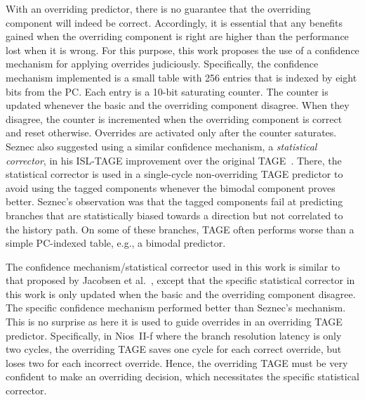 With an overriding predictor, there is no guarantee that the overriding component will indeed be correct. Accordingly, it is essential that any benefits gained when the overriding component is right are higher than the performance lost when it is wrong. For this purpose, this work proposes the use of a confidence mechanism for applying overrides judiciously. Specifically, the confidence mechanism implemented is a small table with 256 entries that is indexed by eight bits from the PC. Each entry is a 10-bit saturating counter.  The counter is updated whenever the basic and the overriding component disagree. When they disagree, the counter is incremented when the overriding component is correct and reset otherwise. Overrides are activated only after the counter saturates. Seznec also suggested using a similar confidence mechanism, a \textit{statistical corrector}, in his ISL-TAGE improvement over the original TAGE~\cite{isltage}.  There, the statistical corrector is used in a single-cycle non-overriding TAGE predictor to avoid using the tagged components whenever the bimodal component proves better.  Seznec's observation was that the tagged components fail at predicting branches that are statistically biased towards a direction but not correlated to the history path. On some of these branches, TAGE often performs worse than a simple PC-indexed table, e.g., a bimodal predictor.

The confidence mechanism/statistical corrector used in this work is similar to that proposed by Jacobsen et al.~\cite{confidence}, except that the specific statistical corrector in this work is only updated when the basic and the overriding component disagree. The specific confidence mechanism performed better than Seznec's mechanism. This is no surprise as here it is used to guide overrides in an overriding TAGE predictor. Specifically, in Nios~II-f where the branch resolution latency is only two cycles, the overriding TAGE saves one cycle for each correct override, but loses two for each incorrect override.
Hence, the overriding TAGE must be very confident to make an overriding decision, which necessitates the specific statistical corrector.

